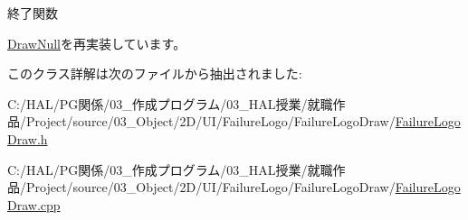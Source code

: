 終了関数 



\mbox{\hyperlink{class_draw_null_a12d44e341c7364b5ab9cdd661dc16187}{Draw\+Null}}を再実装しています。



このクラス詳解は次のファイルから抽出されました\+:\begin{DoxyCompactItemize}
\item 
C\+:/\+H\+A\+L/\+P\+G関係/03\+\_\+作成プログラム/03\+\_\+\+H\+A\+L授業/就職作品/\+Project/source/03\+\_\+\+Object/2\+D/\+U\+I/\+Failure\+Logo/\+Failure\+Logo\+Draw/\mbox{\hyperlink{_failure_logo_draw_8h}{Failure\+Logo\+Draw.\+h}}\item 
C\+:/\+H\+A\+L/\+P\+G関係/03\+\_\+作成プログラム/03\+\_\+\+H\+A\+L授業/就職作品/\+Project/source/03\+\_\+\+Object/2\+D/\+U\+I/\+Failure\+Logo/\+Failure\+Logo\+Draw/\mbox{\hyperlink{_failure_logo_draw_8cpp}{Failure\+Logo\+Draw.\+cpp}}\end{DoxyCompactItemize}
